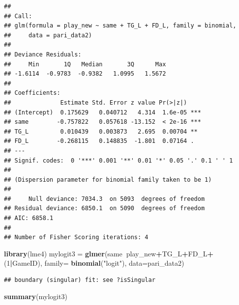 \documentclass[]{book}
\newenvironment{Shaded}{\begin{snugshade}}{\end{snugshade}}
\newcommand{\KeywordTok}[1]{\textcolor[rgb]{0.13,0.29,0.53}{\textbf{#1}}}
\newcommand{\DataTypeTok}[1]{\textcolor[rgb]{0.13,0.29,0.53}{#1}}
\newcommand{\DecValTok}[1]{\textcolor[rgb]{0.00,0.00,0.81}{#1}}
\newcommand{\StringTok}[1]{\textcolor[rgb]{0.31,0.60,0.02}{#1}}
\newcommand{\OperatorTok}[1]{\textcolor[rgb]{0.81,0.36,0.00}{\textbf{#1}}}
\newcommand{\NormalTok}[1]{#1}
\begin{document}
\begin{verbatim}
## 
## Call:
## glm(formula = play_new ~ same + TG_L + FD_L, family = binomial, 
##     data = pari_data2)
## 
## Deviance Residuals: 
##     Min       1Q   Median       3Q      Max  
## -1.6114  -0.9783  -0.9382   1.0995   1.5672  
## 
## Coefficients:
##              Estimate Std. Error z value Pr(>|z|)    
## (Intercept)  0.175629   0.040712   4.314  1.6e-05 ***
## same        -0.757822   0.057618 -13.152  < 2e-16 ***
## TG_L         0.010439   0.003873   2.695  0.00704 ** 
## FD_L        -0.268115   0.148835  -1.801  0.07164 .  
## ---
## Signif. codes:  0 '***' 0.001 '**' 0.01 '*' 0.05 '.' 0.1 ' ' 1
## 
## (Dispersion parameter for binomial family taken to be 1)
## 
##     Null deviance: 7034.3  on 5093  degrees of freedom
## Residual deviance: 6850.1  on 5090  degrees of freedom
## AIC: 6858.1
## 
## Number of Fisher Scoring iterations: 4
\end{verbatim}

\begin{Shaded}
\begin{Highlighting}[]
\KeywordTok{library}\NormalTok{(lme4)}
\NormalTok{mylogit3 =}\StringTok{ }\KeywordTok{glmer}\NormalTok{(same}\OperatorTok{~}\NormalTok{play_new}\OperatorTok{+}\NormalTok{TG_L}\OperatorTok{+}\NormalTok{FD_L}\OperatorTok{+}\NormalTok{(}\DecValTok{1}\OperatorTok{|}\NormalTok{GameID), }\DataTypeTok{family=} \KeywordTok{binomial}\NormalTok{(}\StringTok{"logit"}\NormalTok{), }\DataTypeTok{data=}\NormalTok{pari_data2)}
\end{Highlighting}
\end{Shaded}

\begin{verbatim}
## boundary (singular) fit: see ?isSingular
\end{verbatim}

\begin{Shaded}
\begin{Highlighting}[]
\KeywordTok{summary}\NormalTok{(mylogit3)}
\end{Highlighting}
\end{Shaded}
\end{document}
